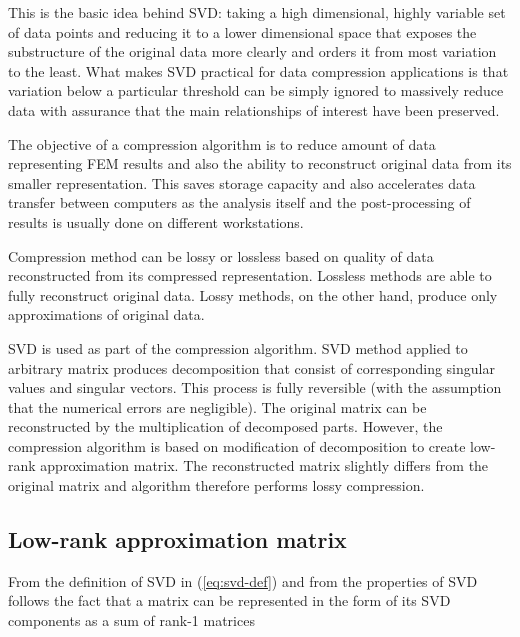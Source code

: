 This is the basic idea behind SVD: taking a high dimensional, highly variable set of data points and reducing it to a lower dimensional space that exposes the substructure of the original data more clearly and orders it from most variation to the least. What makes SVD practical for data compression applications is that variation below a particular threshold can be simply ignored to massively reduce data with assurance that the main relationships of interest have been preserved.

The objective of a compression algorithm is to reduce amount of data representing FEM results and also the ability to reconstruct original data from its smaller representation. This saves storage capacity and also accelerates data transfer between computers as the analysis itself and the post-processing of results is usually done on different workstations.

Compression method can be lossy or lossless based on quality of data reconstructed from its compressed representation. Lossless methods are able to fully reconstruct original data. Lossy methods, on the other hand, produce only approximations of original data. 

SVD is used as part of the compression algorithm. SVD method applied to arbitrary matrix produces decomposition that consist of corresponding singular values and singular vectors. This process is fully reversible (with the assumption that the numerical errors are negligible). The original matrix can be reconstructed by the multiplication of decomposed parts. However, the compression algorithm is based on modification of decomposition to create low-rank approximation matrix. The reconstructed matrix slightly differs from the original matrix and algorithm therefore performs lossy compression.


\subsection{Low-rank approximation matrix}

From the definition of SVD in (\ref{eq:svd-def}) and from the properties of SVD follows the fact that a matrix can be represented in the form of its SVD components as a sum of rank-1 matrices

